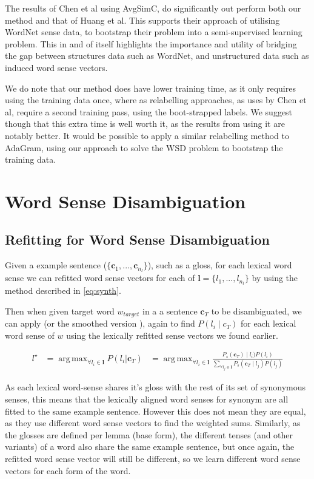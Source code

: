 \documentclass{sig-alternate}
\renewcommand{\c}{\mathbf{c}}
\renewcommand{\l}{\mathbf{l}}
\DeclareMathOperator*{\argmax}{arg\,max}
\begin{document}
The results of Chen et al using AvgSimC, do significantly out perform both our method and that of Huang et al. This supports their approach of utilising WordNet sense data, to bootstrap their problem into a semi-supervised learning problem. This in and of itself highlights the importance and utility of bridging the gap between structures data such as WordNet, and unstructured data such as induced word sense vectors.


We do note that our method does have lower training time, as it only requires using the training data once, where as relabelling approaches, as uses by Chen et al, require a second training pass, using the boot-strapped labels. We suggest though that this extra time is well worth it, as the results from using it are notably better. It would be possible to apply a similar relabelling method to AdaGram, using our approach to solve the WSD problem to bootstrap the training data.


\section{Word Sense Disambiguation}

\subsection{Refitting for Word Sense Disambiguation} \label{lexicalWSD}
Given a example sentence ($\{\c_1,...,\c_{n_l}\}$), such as a gloss, for each lexical word sense we can refitted word sense vectors for each of $\l=\{l_1,..., l_{n_l}\}$ by using the method described in \cref{eq:synth}.

Then when given target word $w_{target}$ in a a sentence $\c_{T}$ to be disambiguated, we can apply  (or the smoothed version ), again to find $P(l_i \mid c_{T})$ for each lexical word sense of $w$ using the lexically refitted sense vectors we found earlier.

\[
\begin{aligned}\label{eq:lexicalwsd}
l^\star &= \argmax_{\forall l_i \in \l} P(l_i|\c_T)
&= \argmax_{\forall l_i \in \l} \frac{P_s(\c_T) \mid l_i)P(l_i)}{\sum_{\forall l_j \in \l} P_s(\c_T \mid l_j)P(l_j)}
\end{aligned}
\]

As each lexical word-sense shares it's gloss with the rest of its set of synonymous senses, this means that the lexically aligned word senses for synonym are all fitted to the same example sentence. However this does not mean they are equal, as they use different word sense vectors to find the weighted sums. Similarly, as the glosses are defined per lemma (base form), the different tenses (and other variants) of a word also share the same example sentence, but once again, the refitted word sense vector will still be different, so we learn different word sense vectors for each form of the word.
\end{document}
